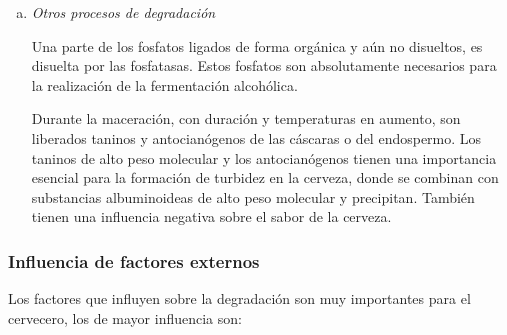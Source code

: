 \begin{enumerate}[a)]
                    \item \textit{Otros procesos de degradación}
                        \par Una parte de los fosfatos ligados de forma orgánica y aún no disueltos, es disuelta por las fosfatasas. Estos fosfatos son absolutamente necesarios para la realización de la fermentación alcohólica.
                        
                        \par Durante la maceración, con duración y temperaturas en aumento, son liberados taninos y antocianógenos de las cáscaras o del endospermo. Los taninos de alto peso molecular y los antocianógenos tienen una importancia esencial para la formación de turbidez en la cerveza, donde se combinan con substancias albuminoideas de alto peso molecular y precipitan. También tienen una influencia negativa sobre el sabor de la cerveza.
                \end{enumerate}
            \subsubsection{Influencia de factores externos}
                \par Los factores que influyen sobre la degradación son muy importantes para el cervecero, los de mayor influencia son:
                
